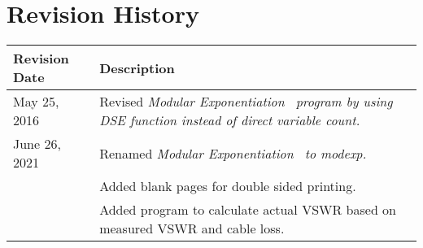 	\thispagestyle{empty}
	\section*{Revision History}
	\begin{tabular}{|p{1in}|p{5.0in}|}	
	\hline 
	\bf Revision Date & \bf Description \\ 
	\hline 
	May 25, 2016 & Revised \it Modular Exponentiation \rm\ program by using DSE function instead of direct variable count.	\\
	\hline
	June 26, 2021 & Renamed \it Modular Exponentiation \rm\ to \it modexp.	\\
	& Added blank pages for double sided printing. \\
	& Added program to calculate actual VSWR based on measured VSWR and cable loss. \\
	\hline
	\end{tabular} 
	\pagebreak
